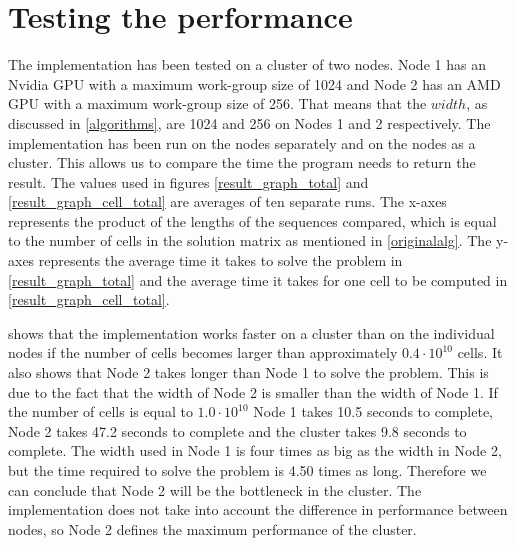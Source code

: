 \begin{figure*}[htb]
    \centering
    \subfloat[][Overview]{\label{result_graph}}%
    \subfloat[][Zoomed in]{\label{result_graph_zoom}}
    \caption{Average time to compute edit distance} \label{result_graph_total}
\end{figure*}

\begin{figure*}[htb]
    \centering
    \subfloat[][Overview]{\label{result_graph_cell}}%
    \subfloat[][Zoomed in]{\label{result_graph_cell_zoom}}
    \caption{Average time per cell} \label{result_graph_cell_total}
\end{figure*}

\section{Testing the performance} \label{testing}
The implementation has been tested on a cluster of two nodes.
Node 1 has an Nvidia GPU with a maximum work-group size of 1024 and Node 2 has an AMD GPU with a maximum work-group size of 256.
That means that the $width$, as discussed in \cref{algorithms}, are 1024 and 256 on Nodes 1 and 2 respectively.
The implementation has been run on the nodes separately and on the nodes as a cluster.
This allows us to compare the time the program needs to return the result.
The values used in figures \ref{result_graph_total} and \ref{result_graph_cell_total} are averages of ten separate runs.
The x-axes represents the product of the lengths of the sequences compared, which is equal to the number of cells in the solution matrix as mentioned in \cref{originalalg}.
The y-axes represents the average time it takes to solve the problem in \cref{result_graph_total} and the average time it takes for one cell to be computed in \cref{result_graph_cell_total}.

 shows that the implementation works faster on a cluster than on the individual nodes if the number of cells becomes larger than approximately $0.4 \cdot 10^{10}$ cells.
It also shows that Node 2 takes longer than Node 1 to solve the problem.
This is due to the fact that the width of Node 2 is smaller than the width of Node 1.
If the number of cells is equal to $1.0 \cdot 10^{10}$ Node 1 takes 10.5 seconds to complete, Node 2 takes 47.2 seconds to complete and the cluster takes 9.8 seconds to complete.
The width used in Node 1 is four times as big as the width in Node 2, but the time required to solve the problem is 4.50 times as long.
Therefore we can conclude that Node 2 will be the bottleneck in the cluster.
The implementation does not take into account the difference in performance between nodes, so Node 2 defines the maximum performance of the cluster.

